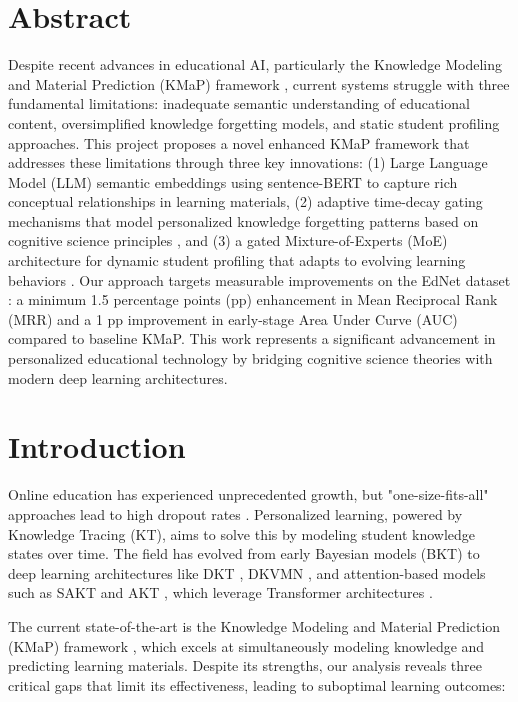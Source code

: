\documentclass[project-plan]{report-template}
\begin{document}
\section*{Abstract}
Despite recent advances in educational AI, particularly the Knowledge Modeling and Material Prediction (KMaP) framework \cite{hashemifar2025personalized}, current systems struggle with three fundamental limitations: inadequate semantic understanding of educational content, oversimplified knowledge forgetting models, and static student profiling approaches. This project proposes a novel enhanced KMaP framework that addresses these limitations through three key innovations: (1) Large Language Model (LLM) semantic embeddings using sentence-BERT to capture rich conceptual relationships in learning materials, (2) adaptive time-decay gating mechanisms that model personalized knowledge forgetting patterns based on cognitive science principles \cite{sha2024forgetting,wang2024personalized}, and (3) a gated Mixture-of-Experts (MoE) architecture for dynamic student profiling that adapts to evolving learning behaviors \cite{li2025tutorllm,zou2025multi}. Our approach targets measurable improvements on the EdNet dataset \cite{choi2020ednet}: a minimum 1.5 percentage points (pp) enhancement in Mean Reciprocal Rank (MRR) and a 1 pp improvement in early-stage Area Under Curve (AUC) compared to baseline KMaP. This work represents a significant advancement in personalized educational technology by bridging cognitive science theories with modern deep learning architectures.


\section{Introduction}

Online education has experienced unprecedented growth, but "one-size-fits-all" approaches lead to high dropout rates \cite{siemens2013learning}. Personalized learning, powered by Knowledge Tracing (KT), aims to solve this by modeling student knowledge states over time. The field has evolved from early Bayesian models (BKT) \cite{corbett1994knowledge} to deep learning architectures like DKT \cite{piech2015deep}, DKVMN \cite{zhang2017dynamic}, and attention-based models such as SAKT \cite{pandey2019self} and AKT \cite{ghosh2020context}, which leverage Transformer architectures \cite{vaswani2017attention}.

The current state-of-the-art is the Knowledge Modeling and Material Prediction (KMaP) framework \cite{hashemifar2025personalized}, which excels at simultaneously modeling knowledge and predicting learning materials. Despite its strengths, our analysis reveals three critical gaps that limit its effectiveness, leading to suboptimal learning outcomes:
\end{document}
